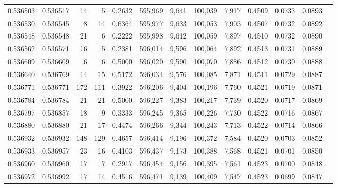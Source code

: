 \begin{tabular}{rrrrrrrrrrrrr}
0.536503 & 0.536517 &    14 &     5 &                                     0.2632 & 595,969 &   9,641 & 100,039 &   7,917 & 0.4509 & 0.0733 & 0.0893 \\
0.536530 & 0.536545 &     8 &    14 &                                     0.6364 & 595,977 &   9,633 & 100,053 &   7,903 & 0.4507 & 0.0732 & 0.0892 \\
0.536548 & 0.536548 &    21 &     6 &                                     0.2222 & 595,998 &   9,612 & 100,059 &   7,897 & 0.4510 & 0.0732 & 0.0890 \\
0.536562 & 0.536571 &    16 &     5 &                                     0.2381 & 596,014 &   9,596 & 100,064 &   7,892 & 0.4513 & 0.0731 & 0.0889 \\
0.536609 & 0.536609 &     6 &     6 &                                     0.5000 & 596,020 &   9,590 & 100,070 &   7,886 & 0.4512 & 0.0730 & 0.0888 \\
0.536640 & 0.536769 &    14 &    15 &                                     0.5172 & 596,034 &   9,576 & 100,085 &   7,871 & 0.4511 & 0.0729 & 0.0887 \\
0.536771 & 0.536771 &   172 &   111 &                                     0.3922 & 596,206 &   9,404 & 100,196 &   7,760 & 0.4521 & 0.0719 & 0.0871 \\
0.536784 & 0.536784 &    21 &    21 &                                     0.5000 & 596,227 &   9,383 & 100,217 &   7,739 & 0.4520 & 0.0717 & 0.0869 \\
0.536797 & 0.536857 &    18 &     9 &                                     0.3333 & 596,245 &   9,365 & 100,226 &   7,730 & 0.4522 & 0.0716 & 0.0867 \\
0.536880 & 0.536880 &    21 &    17 &                                     0.4474 & 596,266 &   9,344 & 100,243 &   7,713 & 0.4522 & 0.0714 & 0.0866 \\
0.536932 & 0.536932 &   148 &   129 &                                     0.4657 & 596,414 &   9,196 & 100,372 &   7,584 & 0.4520 & 0.0703 & 0.0852 \\
0.536933 & 0.536957 &    23 &    16 &                                     0.4103 & 596,437 &   9,173 & 100,388 &   7,568 & 0.4521 & 0.0701 & 0.0850 \\
0.536960 & 0.536960 &    17 &     7 &                                     0.2917 & 596,454 &   9,156 & 100,395 &   7,561 & 0.4523 & 0.0700 & 0.0848 \\
0.536972 & 0.536992 &    17 &    14 &                                     0.4516 & 596,471 &   9,139 & 100,409 &   7,547 & 0.4523 & 0.0699 & 0.0847 \\

\end{tabular}
